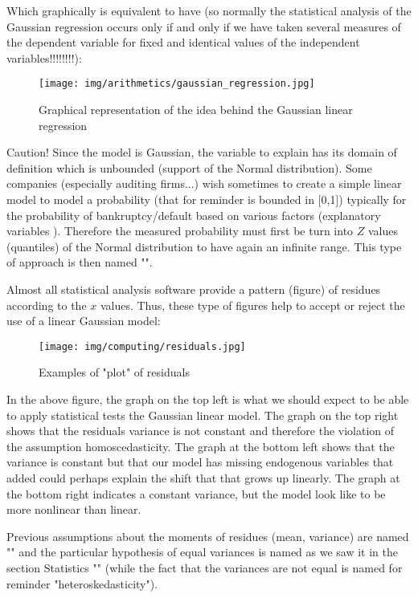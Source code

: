 	Which graphically is equivalent to have (so normally the statistical analysis of the Gaussian regression occurs only if and only if we have taken several measures of the dependent variable for fixed and identical values of the independent variables!!!!!!!!):
	\begin{figure}[H]
		\centering
		\texttt{[image: img/arithmetics/gaussian\_regression.jpg]}
		\caption{Graphical representation of the idea behind the Gaussian linear regression}
	\end{figure}
	Caution! Since the model is Gaussian, the variable to explain has its domain of definition which is unbounded (support of the Normal distribution). Some companies (especially auditing firms...) wish sometimes to create a simple linear model to model a  probability (that for reminder is bounded in [0,1]) typically for the probability of bankruptcy/default based on various factors (explanatory variables ). Therefore the measured probability must first be turn into $Z$ values (quantiles) of the Normal distribution to have again an infinite range. This type of approach is then named "".

	Almost all statistical analysis software provide a pattern (figure) of residues according to the $x$ values. Thus, these type of figures help to accept or reject the use of a linear Gaussian model:

	\begin{figure}[H]
		\centering
		\texttt{[image: img/computing/residuals.jpg]}
		\caption{Examples of "plot" of residuals}
	\end{figure}

	In the above figure, the graph on the top left is what we should expect to be able to apply statistical tests the Gaussian linear model. The graph on the top right shows that the residuals variance is not constant and therefore the violation of the assumption homoscedasticity. The graph at the bottom left shows that the variance is constant but that our model has missing endogenous variables that added could perhaps explain the shift that that grows up linearly. The graph at the bottom right indicates a constant variance, but the model look like to be more nonlinear than linear.

	Previous assumptions about the moments of residues (mean, variance) are named "" and the particular hypothesis of equal variances is named as we saw it in the section Statistics "" (while the fact that the variances are not equal is named for reminder "heteroskedasticity").

